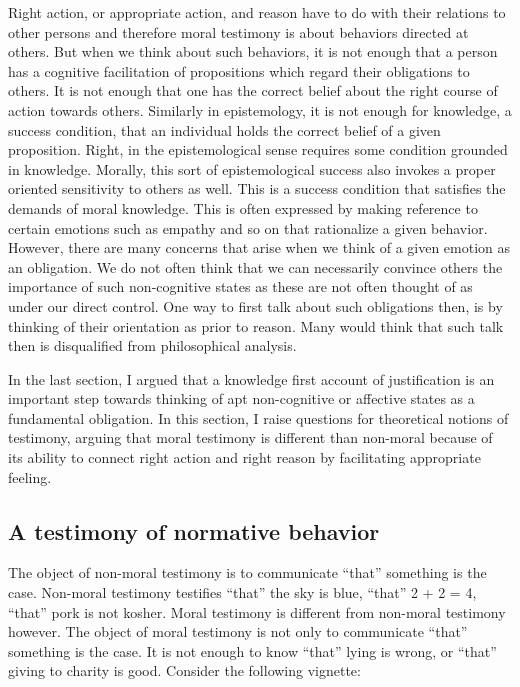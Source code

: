 \documentclass[
  letterpaper,
  DIV=11,
  numbers=noendperiod]{scrartcl}
\theoremstyle{remark}
\begin{document}
Right action, or appropriate action, and reason have to do with their
relations to other persons and therefore moral testimony is about
behaviors directed at others. But when we think about such behaviors, it
is not enough that a person has a cognitive facilitation of propositions
which regard their obligations to others. It is not enough that one has
the correct belief about the right course of action towards others.
Similarly in epistemology, it is not enough for knowledge, a success
condition, that an individual holds the correct belief of a given
proposition. Right, in the epistemological sense requires some condition
grounded in knowledge. Morally, this sort of epistemological success
also invokes a proper oriented sensitivity to others as well. This is a
success condition that satisfies the demands of moral knowledge. This is
often expressed by making reference to certain emotions such as empathy
and so on that rationalize a given behavior. However, there are many
concerns that arise when we think of a given emotion as an obligation.
We do not often think that we can necessarily convince others the
importance of such non-cognitive states as these are not often thought
of as under our direct control. One way to first talk about such
obligations then, is by thinking of their orientation as prior to
reason. Many would think that such talk then is disqualified from
philosophical analysis.

In the last section, I argued that a knowledge first account of
justification is an important step towards thinking of apt non-cognitive
or affective states as a fundamental obligation. In this section, I
raise questions for theoretical notions of testimony, arguing that moral
testimony is different than non-moral because of its ability to connect
right action and right reason by facilitating appropriate feeling.

\subsection{A testimony of normative
behavior}\label{a-testimony-of-normative-behavior}

The object of non-moral testimony is to communicate ``that'' something
is the case. Non-moral testimony testifies ``that'' the sky is blue,
``that'' 2 + 2 = 4, ``that'' pork is not kosher. Moral testimony is
different from non-moral testimony however. The object of moral
testimony is not only to communicate ``that'' something is the case. It
is not enough to know ``that'' lying is wrong, or ``that'' giving to
charity is good. Consider the following vignette:
\end{document}
